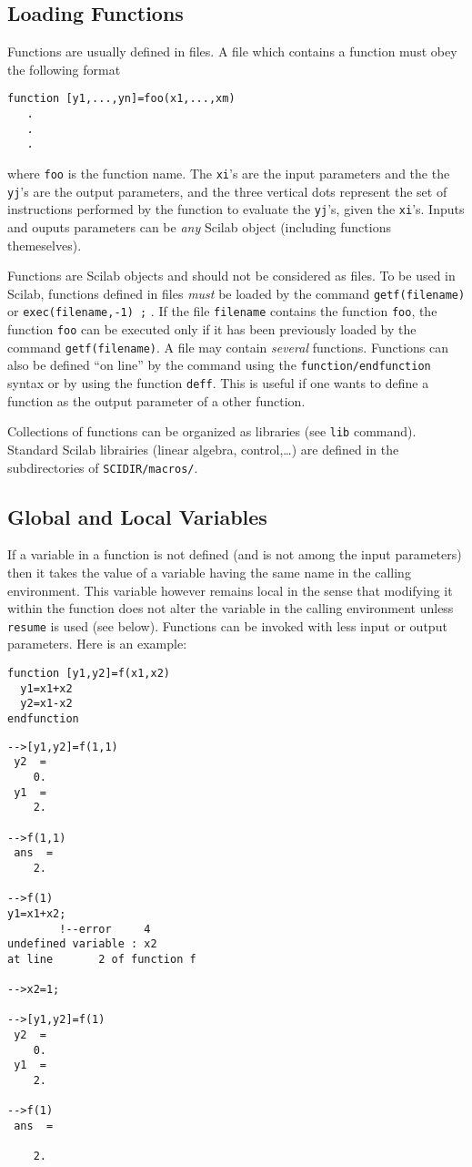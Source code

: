 \subsection{Loading Functions}
Functions are usually defined in files. A file which contains a function
must obey the following format
\begin{verbatim}
function [y1,...,yn]=foo(x1,...,xm)
   .
   .
   .
\end{verbatim}
where {\tt foo} is the function name. The {\tt xi}'s  are the input 
parameters and the the {\tt yj}'s  are the  output parameters, and
the three vertical dots represent the set of instructions performed by
the function to evaluate the {\tt yj}'s, given the {\tt xi}'s.
Inputs and ouputs parameters can be {\it any} Scilab object
(including functions themeselves).

Functions are Scilab objects and should not be considered as files. To
be used in Scilab, functions defined in files  {\em must} be loaded by 
the command {\tt getf(filename)} or {\tt exec(filename,-1) ;}  . If the file {\tt filename} contains the
function {\tt foo}, the function {\tt foo} can be executed only if
it has been previously loaded by the command {\tt getf(filename)}.
A file may contain {\em several} functions. Functions can also be defined ``on line''
by the command using the {\tt function/endfunction} syntax or by using
the function {\tt deff}. This is useful if one wants to define
a function as the output parameter of a other function. 

Collections of functions can be organized as libraries (see {\tt lib}
command). Standard Scilab librairies (linear algebra, control,\ldots) 
are defined in the subdirectories of {\tt SCIDIR/macros/}.

\subsection{Global and Local Variables}
If a variable in a function is not defined (and is not among the input
parameters) then it takes the value of a variable having the same name in the
calling environment. This variable however remains local in the sense that
modifying it within the function does not alter the variable in the calling
environment unless {\tt resume} is used (see below). Functions
can be invoked with less input or output parameters. Here is an example:
\begin{verbatim}
function [y1,y2]=f(x1,x2)
  y1=x1+x2
  y2=x1-x2
endfunction
\end{verbatim}
\begin{verbatim}
-->[y1,y2]=f(1,1)
 y2  =
    0.  
 y1  =
    2.  

-->f(1,1)
 ans  =
    2.

-->f(1)
y1=x1+x2;
        !--error     4 
undefined variable : x2                      
at line       2 of function f

-->x2=1;

-->[y1,y2]=f(1)
 y2  =
    0.  
 y1  =
    2.  
 
-->f(1)
 ans  =
 
    2. 

\end{verbatim}

